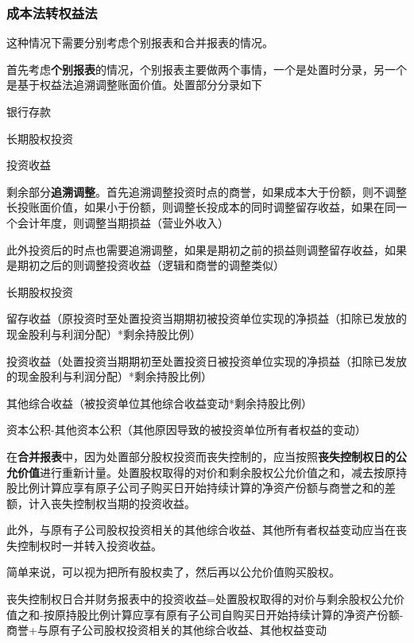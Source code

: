 \documentclass[UTF8,12pt]{ctexart}
\newenvironment{Dr}{%
	\begin{list}{}%
		{
			\setlength{\leftmargin}{2em}
			\setlength{\labelwidth}{2em}
			\setlength{\labelsep}{0pt}
			\setlength{\itemindent}{0pt}
			\setlength{\listparindent}{0pt}
			\setlength{\parsep}{0pt}
			\setlength{\topsep}{0pt}
		}
		\item[\textbf{借：}]
	}{%
	\end{list}
}
\newenvironment{Cr}{%
	\begin{list}{}%
		{
			\setlength{\leftmargin}{2em}
			\setlength{\labelwidth}{2em}
			\setlength{\labelsep}{0pt}
			\setlength{\itemindent}{0pt}
			\setlength{\listparindent}{0pt}
			\setlength{\parsep}{0pt}
			\setlength{\topsep}{0pt}
		}
		\item[\textbf{贷：}]
	}{%
	\end{list}
}
\numberwithin{equation}{section} %
\numberwithin{figure}{section}
\numberwithin{table}{section}
\begin{document}
	
	\subsubsection{成本法转权益法}
	这种情况下需要分别考虑个别报表和合并报表的情况。
	
	首先考虑\textbf{个别报表}的情况，个别报表主要做两个事情，一个是处置时分录，另一个是基于权益法追溯调整账面价值。处置部分分录如下
	
	\begin{Dr}
		银行存款
	\end{Dr}
	\begin{Cr}
		长期股权投资
		
		投资收益
	\end{Cr}
	
	剩余部分\textbf{追溯调整}。首先追溯调整投资时点的商誉，如果成本大于份额，则不调整长投账面价值，如果小于份额，则调整长投成本的同时调整留存收益，如果在同一个会计年度，则调整当期损益（营业外收入）
	
	此外投资后的时点也需要追溯调整，如果是期初之前的损益则调整留存收益，如果是期初之后的则调整投资收益（逻辑和商誉的调整类似）
	
	\begin{Dr}
		长期股权投资
	\end{Dr}
	\begin{Cr}
		留存收益（原投资时至处置投资当期期初被投资单位实现的净损益（扣除已发放的现金股利与利润分配）*剩余持股比例）
		
		投资收益（处置投资当期期初至处置投资日被投资单位实现的净损益（扣除已发放的现金股利与利润分配）*剩余持股比例）
		
		其他综合收益（被投资单位其他综合收益变动*剩余持股比例）
		
		资本公积-其他资本公积（其他原因导致的被投资单位所有者权益的变动）
	\end{Cr}
	
	在\textbf{合并报表}中，因为处置部分股权投资而丧失控制的，应当按照\textbf{丧失控制权日的公允价值}进行重新计量。处置股权取得的对价和剩余股权公允价值之和，减去按原持股比例计算应享有原子公司子购买日开始持续计算的净资产份额与商誉之和的差额，计入丧失控制权当期的投资收益。
	
	此外，与原有子公司股权投资相关的其他综合收益、其他所有者权益变动应当在丧失控制权时一并转入投资收益。
	
	简单来说，可以视为把所有股权卖了，然后再以公允价值购买股权。
	
	丧失控制权日合并财务报表中的投资收益=处置股权取得的对价与剩余股权公允价值之和-按原持股比例计算应享有原有子公司自购买日开始持续计算的净资产份额-商誉+与原有子公司股权投资相关的其他综合收益、其他权益变动
	
\end{document}
